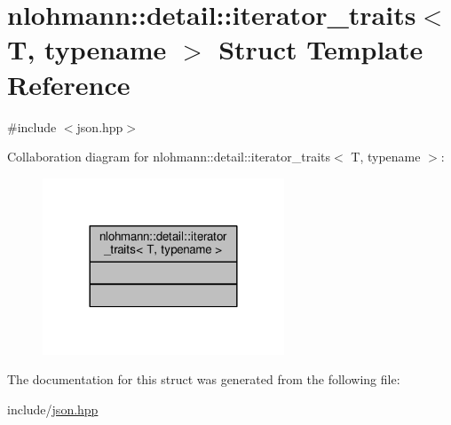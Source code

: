 \hypertarget{structnlohmann_1_1detail_1_1iterator__traits}{}\section{nlohmann\+:\+:detail\+:\+:iterator\+\_\+traits$<$ T, typename $>$ Struct Template Reference}
\label{structnlohmann_1_1detail_1_1iterator__traits}


{\ttfamily \#include $<$json.\+hpp$>$}



Collaboration diagram for nlohmann\+:\+:detail\+:\+:iterator\+\_\+traits$<$ T, typename $>$\+:
\nopagebreak
\begin{figure}[H]
\begin{center}
\leavevmode
\includegraphics[width=204pt]{structnlohmann_1_1detail_1_1iterator__traits__coll__graph}
\end{center}
\end{figure}


The documentation for this struct was generated from the following file\+:\begin{DoxyCompactItemize}
\item 
include/\hyperlink{json_8hpp}{json.\+hpp}\end{DoxyCompactItemize}
